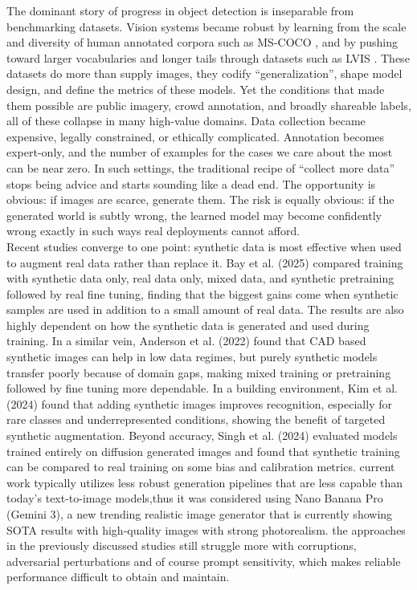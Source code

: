 \documentclass[conference]{IEEEtran}
\begin{document}
The dominant story of progress in object detection is inseparable from benchmarking datasets. Vision systems became robust by learning from the scale and diversity of human annotated corpora such as MS-COCO \citep{lin2014coco}, and by pushing toward larger vocabularies and longer tails through datasets such as LVIS \citep{gupta2019lvis}. These datasets do more than supply images, they codify ``generalization'', shape model design, and define the metrics of these models. Yet the conditions that made them possible are public imagery, crowd annotation, and broadly shareable labels, all of these collapse in many high-value domains. Data collection became expensive, legally constrained, or ethically complicated. Annotation becomes expert-only, and the number of examples for the cases we care about the most can be near zero. In such settings, the traditional recipe of ``collect more data'' stops being advice and starts sounding like a dead end. 
The opportunity is obvious: if images are scarce, generate them. The risk is equally obvious: if the generated world is subtly wrong, the learned model may become confidently wrong exactly in such ways real deployments cannot afford.\\

Recent studies converge to one point: synthetic data is most effective when used to augment real data rather than replace it. Bay et al. (2025) \cite{bay2025impactsyntheticdataobject} compared training with synthetic data only, real data only, mixed data, and synthetic pretraining followed by real fine tuning, finding that the biggest gains come when synthetic samples are used in addition to a small amount of real data. The results are also highly dependent on how the synthetic data is generated and used during training. In a similar vein, Anderson et al. (2022) \cite{anderson2022syntheticimagedatadeep} found that CAD based synthetic images can help in low data regimes, but purely synthetic models transfer poorly because of domain gaps, making mixed training or pretraining followed by fine tuning more dependable. In a building environment, Kim et al. (2024) \cite{kim2024experimental} found that adding synthetic images improves recognition, especially for rare classes and underrepresented conditions, showing the benefit of targeted synthetic augmentation.
Beyond accuracy, Singh et al. (2024) \cite{singh2024syntheticdataneedbenchmarking} evaluated models trained entirely on diffusion generated images and found that synthetic training can be compared to real training on some bias and calibration metrics. current work typically utilizes less robust generation pipelines that are less capable than today’s text-to-image models,thus it was considered using Nano Banana Pro (Gemini 3), a new trending realistic image generator that is currently showing SOTA results with high-quality images with strong photorealism. the approaches in the previously discussed studies still struggle more with corruptions, adversarial perturbations and of course prompt sensitivity, which makes reliable performance difficult to obtain and maintain.\\
\end{document}
